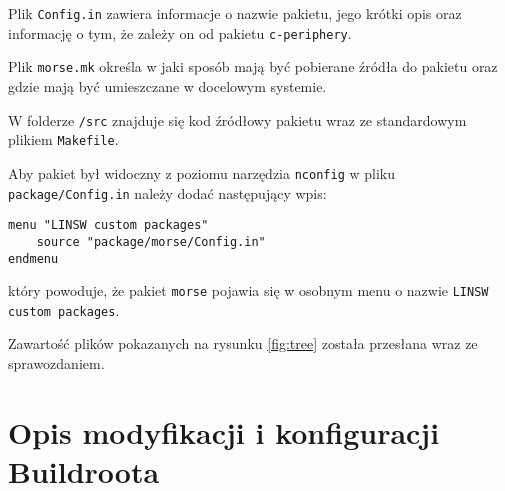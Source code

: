 \documentclass{article}
\begin{document}
Plik \texttt{Config.in} zawiera informacje o nazwie pakietu, jego krótki opis oraz informację o tym, że zależy on od pakietu \texttt{c-periphery}. 

Plik \texttt{morse.mk} określa w jaki sposób mają być pobierane źródła do pakietu oraz gdzie mają być umieszczane w docelowym systemie.

W folderze \texttt{/src} znajduje się kod źródłowy pakietu wraz ze standardowym plikiem \texttt{Makefile}.

Aby pakiet był widoczny z poziomu narzędzia \texttt{nconfig} w pliku \texttt{package/Config.in} należy dodać następujący wpis:

\begin{verbatim}
menu "LINSW custom packages"
    source "package/morse/Config.in"
endmenu
\end{verbatim}

który powoduje, że pakiet \texttt{morse} pojawia się w osobnym menu o nazwie \texttt{LINSW custom packages}.

Zawartość plików pokazanych na rysunku \ref{fig:tree} została przesłana wraz ze sprawozdaniem.

\section{Opis modyfikacji i konfiguracji Buildroota}
\end{document}
